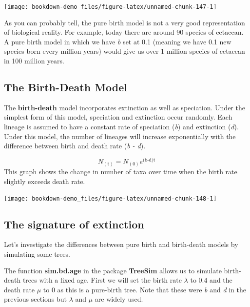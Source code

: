 \documentclass[
]{book}
\begin{document}
\begin{center}\texttt{[image: bookdown-demo\_files/figure-latex/unnamed-chunk-147-1]} \end{center}

As you can probably tell, the pure birth model is not a very good representation of biological reality. For example, today there are around 90 species of cetacean. A pure birth model in which we have \emph{b} set at 0.1 (meaning we have 0.1 new species born every million years) would give us over 1 million species of cetacean in 100 million years.

\hypertarget{the-birth-death-model}{%
\subsection{The Birth-Death Model}\label{the-birth-death-model}}

The \textbf{birth-death} model incorporates extinction as well as speciation. Under the simplest form of this model, speciation and extinction occur randomly. Each lineage is assumed to have a constant rate of speciation (\emph{b}) and extinction (\emph{d}). Under this model, the number of lineages will increase exponentially with the difference between birth and death rate (\emph{b - d}).

\[ N_{(\text{t})} = N_{(0)}e^{\text{(b-d)t}} \]
This graph shows the change in number of taxa over time when the birth rate slightly exceeds death rate.

\begin{center}\texttt{[image: bookdown-demo\_files/figure-latex/unnamed-chunk-148-1]} \end{center}

\hypertarget{the-signature-of-extinction}{%
\subsection{The signature of extinction}\label{the-signature-of-extinction}}

Let's investigate the differences between pure birth and birth-death models by simulating some trees.

The function \textbf{sim.bd.age} in the package \textbf{TreeSim} \citep{treesim} allows us to simulate birth-death trees with a fixed age. First we will set the birth rate \(\lambda\) to 0.4 and the death rate \(\mu\) to 0 as this is a pure-birth tree. Note that these were \emph{b} and \emph{d} in the previous sections but \(\lambda\) and \(\mu\) are widely used.
\end{document}
